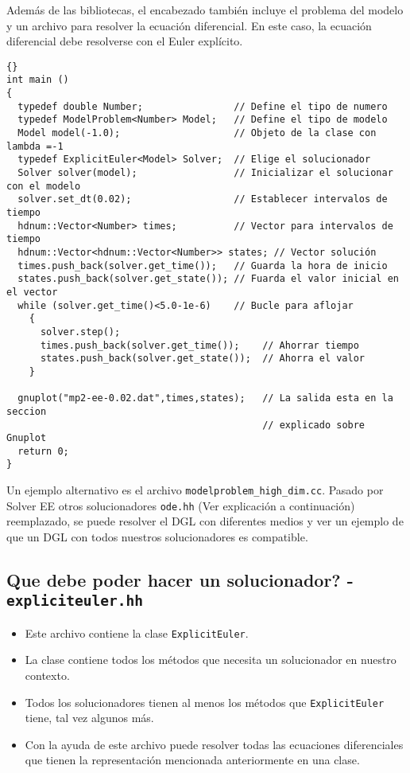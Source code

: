 Además de las bibliotecas, el encabezado también incluye el problema del modelo y un archivo para resolver la ecuación diferencial. En este caso, la ecuación diferencial debe resolverse con el Euler explícito.

{\footnotesize{\begin{lstlisting}{}
int main ()
{
  typedef double Number;                // Define el tipo de numero
  typedef ModelProblem<Number> Model;   // Define el tipo de modelo
  Model model(-1.0);                    // Objeto de la clase con lambda =-1
  typedef ExplicitEuler<Model> Solver;  // Elige el solucionador
  Solver solver(model);                 // Inicializar el solucionar con el modelo
  solver.set_dt(0.02);                  // Establecer intervalos de tiempo
  hdnum::Vector<Number> times;          // Vector para intervalos de tiempo
  hdnum::Vector<hdnum::Vector<Number>> states; // Vector solución
  times.push_back(solver.get_time());   // Guarda la hora de inicio
  states.push_back(solver.get_state()); // Fuarda el valor inicial en el vector
  while (solver.get_time()<5.0-1e-6)    // Bucle para aflojar
    {
      solver.step();
      times.push_back(solver.get_time());    // Ahorrar tiempo
      states.push_back(solver.get_state());  // Ahorra el valor
    }

  gnuplot("mp2-ee-0.02.dat",times,states);   // La salida esta en la seccion
                                             // explicado sobre Gnuplot 
  return 0;
}
\end{lstlisting}}}

Un ejemplo alternativo es el archivo 
\lstinline{modelproblem_high_dim.cc}. Pasado por Solver EE otros solucionadores \lstinline{ode.hh} (Ver explicación a continuación) reemplazado,
se puede resolver el DGL con diferentes medios y ver un ejemplo de que un DGL con todos nuestros solucionadores es compatible. 

\subsection{Que debe poder hacer un solucionador? - \lstinline{expliciteuler.hh}}
\begin{itemize}
\item Este archivo contiene la clase \lstinline{ExplicitEuler}.
\item La clase contiene todos los métodos que necesita un solucionador en nuestro contexto.
\item Todos los solucionadores tienen al menos los métodos que 
  \lstinline{ExplicitEuler} tiene, tal vez algunos más.
\item Con la ayuda de este archivo puede resolver todas las ecuaciones diferenciales que tienen la representación mencionada anteriormente en una clase.
\end{itemize}


